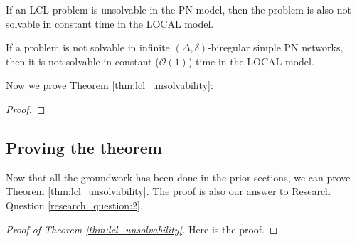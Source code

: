 \begin{theorem} \label{thm:lcl_unsolvability}
    If an LCL problem is unsolvable in the PN model, then the problem is also not solvable in constant time in the LOCAL model.
\end{theorem}

\begin{lemma} \label{lem:lcl_unsolvability:5}
    If a problem is not solvable in infinite $(\Delta, \delta)$-biregular simple PN networks, then it is not solvable in constant ($\mathcal{O}(1)$) time in the LOCAL model.
\end{lemma}

Now we prove Theorem \ref{thm:lcl_unsolvability}:
\begin{proof}
\end{proof}


\subsection{Proving the theorem} \label{sec:algorithm:prooving_the_theorem}
Now that all the groundwork has been done in the prior sections, we can prove Theorem \ref{thm:lcl_unsolvability}.
The proof is also our answer to Research Question \ref{research_question:2}.
\begin{proof}[Proof of Theorem \ref{thm:lcl_unsolvability}]
    Here is the proof.
    \todo{}
\end{proof}

